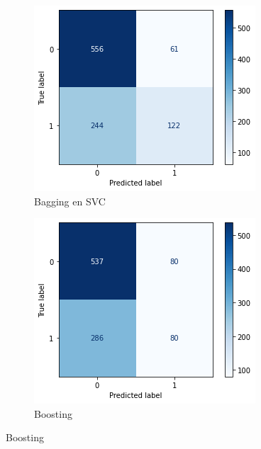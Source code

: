\documentclass{article}
\begin{document}
\begin{figure}[!h]
	\centering
	\begin{subfigure}[b]{0.25\textwidth}
		\centering
		\includegraphics[width=\textwidth]{../images/cmatrix-bagging-svc}
		\caption*{Bagging en SVC}
		\label{fig:knn}
	\end{subfigure}
	\begin{subfigure}[b]{0.25\textwidth}
		\centering
		\includegraphics[width=\textwidth]{../images/cmatrix-boosting}
		\caption*{Boosting}
		\label{fig:three sin x}
	\end{subfigure}
\end{figure}
\end{document}
